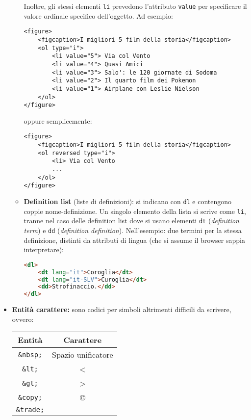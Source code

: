 \documentclass[a4paper,11pt]{article}
\begin{document}
\begin{itemize}
\begin{itemize}
			Inoltre, gli stessi elementi \lstinline|li| prevedono l'attributo \lstinline|value| per specificare il valore ordinale specifico dell'oggetto. Ad esempio:
\begin{lstlisting}
<figure>
	<figcaption>I migliori 5 film della storia</figcaption>
	<ol type="i">
		<li value="5"> Via col Vento
		<li value="4"> Quasi Amici
		<li value="3"> Salo': le 120 giornate di Sodoma
		<li value="2"> Il quarto film dei Pokemon
		<li value="1"> Airplane con Leslie Nielson
	</ol>
</figure>
\end{lstlisting}
oppure semplicemente:
\begin{lstlisting}
<figure>
	<figcaption>I migliori 5 film della storia</figcaption>
	<ol reversed type="i">
		<li> Via col Vento
		...
	</ol>
</figure>
\end{lstlisting}
		\item \textbf{Definition list} (liste di definizioni): si indicano con \lstinline|dl| e contengono coppie nome-definizione.
	Un singolo elemento della lista si scrive come \lstinline|li|, tranne nel caso delle definition list dove si usano elementi \lstinline|dt| (\textit{definition term}) e \lstinline|dd| (\textit{definition definition}).
Nell'esempio: due termini per la stessa definizione, distinti da attributi di lingua (che si assume il browser sappia interpretare):
\begin{lstlisting}[language=html, style=codestyle]	
<dl>
	<dt lang="it">Coroglia</dt>
	<dt lang="it-SLV">Curoglia</dt>
	<dd>Strofinaccio.</dd>
</dl>
\end{lstlisting}
\end{itemize}
	
\item \textbf{Entità carattere:} sono codici per simboli altrimenti difficili da scrivere, ovvero:
	\begin{table}[h!]
		\center {}
		\begin{tabular} { c | c }
			\bfseries Entità & \bfseries Carattere \\
			\hline 
			\texttt{\&nbsp;} & Spazio unificatore \\ 
			\texttt{\&lt;} & < \\
			\texttt{\&gt;} & > \\
			\texttt{\&copy;} & \copyright \\
			\texttt{\&trade;} & \texttrademark \\
		\end{tabular}
	\end{table}

\end{itemize}
\end{document}
